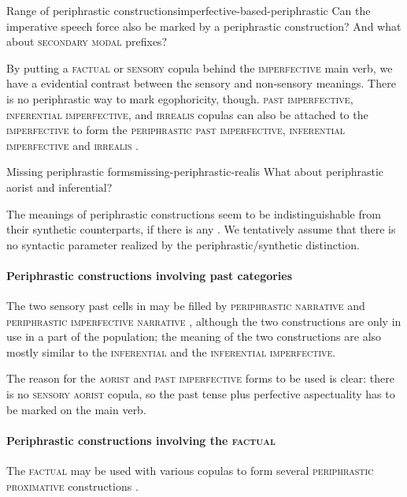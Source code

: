 \documentclass[a4paper, oneside, 12pt]{report}
\newcommand*{\citesec}[1]{\S~{#1}}
\newcommand*{\citepage}[1]{p.~{#1}}
\newcommand{\category}[1]{\textsc{#1}}
\begin{document}
\begin{todobox}{Range of periphrastic constructions}{imperfective-based-periphrastic}
    Can the imperative speech force also be marked by a periphrastic construction?
    And what about \category{secondary modal} prefixes?
\end{todobox}

By putting a \category{factual} or \category{sensory} copula
behind the \category{imperfective} main verb,
we have a evidential contrast between the sensory and non-sensory meanings.
There is no periphrastic way to mark egophoricity, though.
\category{past imperfective}, \category{inferential imperfective}, and \category{irrealis} copulas
can also be attached to the \category{imperfective}
to form the \category{periphrastic past imperfective, inferential imperfective} 
and \category{irrealis} \citep[\citesec{21.2.2}]{jacques2021grammar}.

\begin{todobox}{Missing periphrastic forms}{missing-periphrastic-realis}
    What about periphrastic aorist and inferential?
\end{todobox}

The meanings of periphrastic constructions seem to be indistinguishable
from their synthetic counterparts, if there is any
\citep[\citepage{1089, 1092}]{jacques2021grammar}.
We tentatively assume that there is no syntactic parameter realized 
by the periphrastic/synthetic distinction.

\paragraph*{Periphrastic constructions involving past categories}
The two sensory past cells in  may be filled by 
\category{periphrastic narrative} \citep[\citesec{21.5.1.8}]{jacques2021grammar}
and \category{periphrastic imperfective narrative} \citep[\citepage{1157}]{jacques2021grammar},
although the two constructions are only in use in a part of the population; 
the meaning of the two constructions are also mostly similar to 
the \category{inferential} and the \category{inferential imperfective}.

The reason for the \category{aorist} and \category{past imperfective} forms to be used is clear:
there is no \category{sensory aorist} copula,
so the past tense plus perfective aspectuality has to be marked on the main verb.

\paragraph*{Periphrastic constructions involving the \category{factual}}
The \category{factual} may be used with 
various copulas to form several \category{periphrastic proximative} constructions
\citep[\citesec{21.3.1.4}]{jacques2021grammar}.
\end{document}
